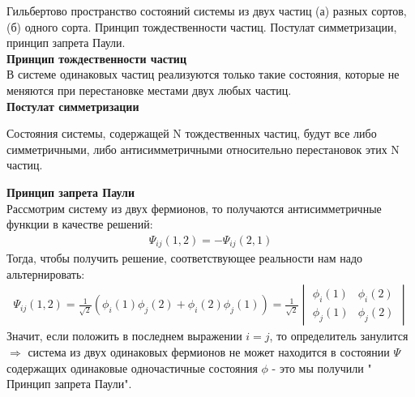 \documentclass[__main__.tex]{subfiles}
\begin{document}
Гильбертово пространство состояний системы из двух частиц (а) разных сортов, (б) одного сорта. Принцип тождественности частиц. Постулат симметризации, принцип запрета Паули.\\ 

\textbf{Принцип тождественности частиц}\\
В системе одинаковых частиц реализуются только такие состояния, которые не меняются при перестановке местами двух любых частиц.\\
\textbf{Постулат симметризации}\\
\begin{definition}
Состояния системы, содержащей N тождественных частиц, будут все либо симметричными, либо антисимметричными относительно перестановок этих N частиц.\\
\end{definition}
\textbf{Принцип запрета Паули}\\
Рассмотрим систему из двух фермионов, то получаются антисимметричные функции в качестве решений:
\begin{gather}
\Psi_{ij}(1,2) = -\Psi_{ij}(2,1)
\end{gather}
Тогда, чтобы получить решение, соответствующее реальности нам надо альтернировать:\\
\begin{gather}
\Psi_{ij}(1,2)=\frac{1}{\sqrt{2}}(\phi_i(1)\phi_j(2)+\phi_i(2)\phi_j(1)) = \frac{1}{\sqrt{2}} \begin{vmatrix}
\phi_i(1) & \phi_i(2)\\
\phi_j(1) & \phi_j(2)
\end{vmatrix}
\end{gather}
Значит, если положить в последнем выражении $i=j$, то определитель занулится $\Longrightarrow$ система из двух одинаковых фермионов не может находится в состоянии $\Psi$ содержащих одинаковые одночастичные состояния $\phi$ - это мы получили " Принцип запрета Паули".
\end{document}
